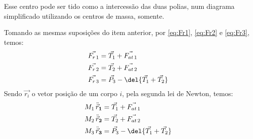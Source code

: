 \documentclass[]{IMTexam}
\begin{document}
\begin{questions}
\begin{parts}
\begin{solution}
\begin{multi}
\begin{center}
				\end{center}
				\nextcol

				Esse centro pode ser tido como a intercessão das duas polias, num diagrama simplificado utilizando os centros de massa, somente.

				\begin{center}
				\end{center}
			\end{multi}

			Tomando as mesmas suposições do item anterior, por \ref{eq:Fr1}, \ref{eq:Fr2} e \ref{eq:Fr3}, temos:
			\begin{align}
				\vec{F_{r\,1}} & =\vec{T_1}+\vec{F_{at\,1}}\label{eq:Fr1red}           \\
				\vec{F_{r\,2}} & =\vec{T_2}+\vec{F_{at\,2}}\label{eq:Fr2red}           \\
				\vec{F_{r\,3}} & =\vec{P_3}-\del{\vec{T_1}+\vec{T_2}}\label{eq:Fr3red}
			\end{align}
			Sendo $ \vec{r_i} $ o vetor posição de um corpo $ i $, pela segunda lei de Newton, temos:
			\begin{align}
				M_1\,\ddot{\vec{r}}_{\mathbf{1}} & =\vec{T_1}+\vec{F_{at\,1}}\label{eq:Motion1}           \\
				M_2\,\ddot{\vec{r}}_{\mathbf{2}} & =\vec{T_2}+\vec{F_{at\,2}}\label{eq:Motion2}           \\
				M_3\,\ddot{\vec{r}}_{\mathbf{3}} & =\vec{P_3}-\del{\vec{T_1}+\vec{T_2}}\label{eq:Motion3}
			\end{align}


\end{solution}
\end{parts}
\end{questions}
\end{document}
